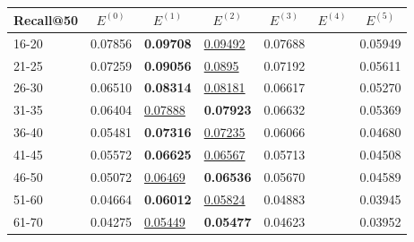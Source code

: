 \begin{table*}[]
    \centering
    \begin{tabular}{|l|l|l|l|l|l|l|}
        \hline
        Recall@50 & \multicolumn{1}{c|}{$E^{(0)}$} & \multicolumn{1}{c|}{$E^{(1)}$} & \multicolumn{1}{c|}{$E^{(2)}$} & \multicolumn{1}{c|}{$E^{(3)}$} & \multicolumn{1}{c|}{$E^{(4)}$} & \multicolumn{1}{c|}{$E^{(5)}$} \\ \hline
        16-20     & 0.07856                        & \textbf{0.09708}               & \underline{0.09492}            & 0.07688                        &                                & 0.05949                        \\ \hline
        21-25     & 0.07259                        & \textbf{0.09056}               & \underline{0.0895}             & 0.07192                        &                                & 0.05611                        \\ \hline
        26-30     & 0.06510                        & \textbf{0.08314}               & \underline{0.08181}            & 0.06617                        &                                & 0.05270                        \\ \hline
        31-35     & 0.06404                        & \underline{0.07888}            & \textbf{0.07923}               & 0.06632                        &                                & 0.05369                        \\ \hline
        36-40     & 0.05481                        & \textbf{0.07316}               & \underline{0.07235}            & 0.06066                        &                                & 0.04680                        \\ \hline
        41-45     & 0.05572                        & \textbf{0.06625}               & \underline{0.06567}            & 0.05713                        &                                & 0.04508                        \\ \hline
        46-50     & 0.05072                        & \underline{0.06469}            & \textbf{0.06536}               & 0.05670                        &                                & 0.04589                        \\ \hline
        51-60     & 0.04664                        & \textbf{0.06012}               & \underline{0.05824}            & 0.04883                        &                                & 0.03945                        \\ \hline
        61-70     & 0.04275                        & \underline{0.05449}            & \textbf{0.05477}               & 0.04623                        &                                & 0.03952                        \\ \hline

\end{tabular}
\end{table*}

